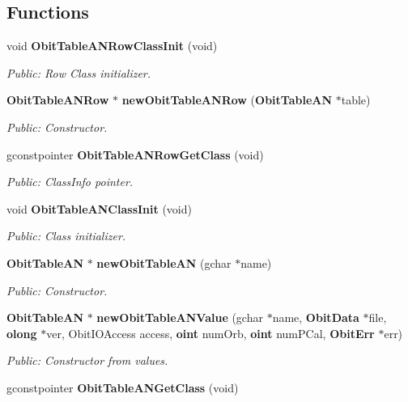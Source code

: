 \subsection*{Functions}
\begin{CompactItemize}
\item 
void {\bf Obit\-Table\-ANRow\-Class\-Init} (void)
\begin{CompactList}\small\item\em Public: Row Class initializer. \item\end{CompactList}\item 
{\bf Obit\-Table\-ANRow} $\ast$ {\bf new\-Obit\-Table\-ANRow} ({\bf Obit\-Table\-AN} $\ast$table)
\begin{CompactList}\small\item\em Public: Constructor. \item\end{CompactList}\item 
gconstpointer {\bf Obit\-Table\-ANRow\-Get\-Class} (void)
\begin{CompactList}\small\item\em Public: Class\-Info pointer. \item\end{CompactList}\item 
void {\bf Obit\-Table\-ANClass\-Init} (void)
\begin{CompactList}\small\item\em Public: Class initializer. \item\end{CompactList}\item 
{\bf Obit\-Table\-AN} $\ast$ {\bf new\-Obit\-Table\-AN} (gchar $\ast$name)
\begin{CompactList}\small\item\em Public: Constructor. \item\end{CompactList}\item 
{\bf Obit\-Table\-AN} $\ast$ {\bf new\-Obit\-Table\-ANValue} (gchar $\ast$name, {\bf Obit\-Data} $\ast$file, {\bf olong} $\ast$ver, Obit\-IOAccess access, {\bf oint} num\-Orb, {\bf oint} num\-PCal, {\bf Obit\-Err} $\ast$err)
\begin{CompactList}\small\item\em Public: Constructor from values. \item\end{CompactList}\item 
gconstpointer {\bf Obit\-Table\-ANGet\-Class} (void)

\end{CompactItemize}
